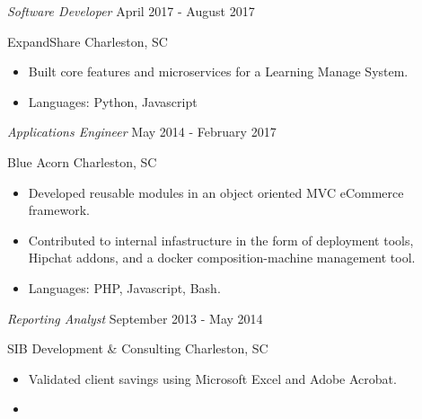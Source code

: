 \documentclass[11pt,article,oneside]{memoir}
\begin{document}
\ind \emph{Software Developer} \hfill {\small April 2017 - August 2017}
\vspace{0.1em}

\ind ExpandShare \hfill {\small Charleston, SC}
\small
\begin{itemize}
  \item Built core features and microservices for a Learning Manage System.
  \item Languages: Python, Javascript
\end{itemize}
\normalsize

\ind \emph{Applications Engineer} \hfill {\small May 2014 - February 2017}
\vspace{0.1em}

\ind Blue Acorn \hfill {\small Charleston, SC}
\small
\begin{itemize}
  \item Developed reusable modules in an object oriented MVC eCommerce
    framework.
  \item Contributed to internal infastructure in the form of deployment tools,
    Hipchat addons, and a docker composition-machine management tool.
  \item Languages: PHP, Javascript, Bash.
\end{itemize}
\normalsize

\ind \emph{Reporting Analyst} \hfill {\small September 2013 - May 2014}
\vspace{0.1em}

\ind SIB Development \& Consulting \hfill {\small Charleston, SC}
\small
\begin{itemize}
  \item Validated client savings using Microsoft Excel and Adobe Acrobat.
  \item 
\end{itemize}
\normalsize

\bigskip


\medskip
\end{document}

